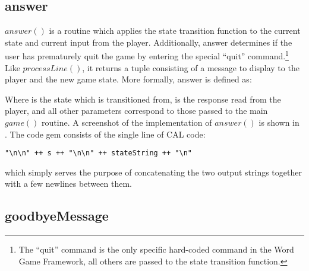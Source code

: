 
\subsection{answer}

\(answer()\) is a routine which applies the state transition function to the current state and current input from the player.  Additionally, answer determines if the user has prematurely quit the game by entering the special ``quit'' command.\footnote{The ``quit'' command is the only specific hard-coded command in the Word Game Framework, all others are passed to the state transition function.}  Like \(processLine()\), it returns a tuple consisting of a message to display to the player and the new game state.  More formally, answer is defined as:


Where  is the state which is transitioned from,  is the response read from the player, and all other parameters correspond to those passed to the main \(game()\) routine.  A screenshot of the implementation of \(answer()\) is shown in .  The  code gem consists of the single line of CAL code:

\begin{verbatim}
"\n\n" ++ s ++ "\n\n" ++ stateString ++ "\n"
\end{verbatim}

which simply serves the purpose of concatenating the two output strings together with a few newlines between them.


\subsection{goodbyeMessage}

